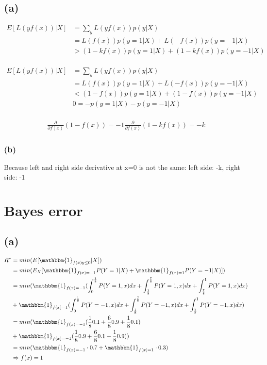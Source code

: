 \documentclass[a4paper]{scrartcl}
\begin{document}
  \subsection*{(a)}
    \begin{align*}
      E[L(yf(x)) \vert X]
      &= \sum_y L(yf(x)) p(y\vert X) \\
      &=  L(f(x)) p(y=1\vert X) + L(-f(x)) p(y=-1\vert X) \\
      &> (1-k f(x)) p(y=1\vert X) + (1-k f(x)) p(y=-1\vert X) \\
    \end{align*}

    \begin{align*}
      E[L(yf(x)) \vert X]
      &= \sum_y L(yf(x)) p(y\vert X) \\
      &=  L(f(x)) p(y=1\vert X) + L(-f(x)) p(y=-1\vert X) \\
      &< (1-f(x)) p(y=1\vert X) + (1-f(x)) p(y=-1\vert X) \\
      &0 = - p(y=1\vert X) - p(y=-1\vert X) \\
    \end{align*}

    \begin{align*}
      \frac{\partial}{\partial f(x)} (1-f(x)) = -1
      \frac{\partial}{\partial f(x)} (1-kf(x)) = -k
    \end{align*}




  \subsubsection*{(b)}
    Because left and right side derivative at x=0 is not the same:
    left side: -k, right side: -1

\section{Bayes error}
  \subsection*{(a)}
    \begin{align*}
      R^* & = min(E[\mathbbm{1}_{f(x) y\leq 0} \vert X])\\
      & = min(E_X [\mathbbm{1}_{f(x)=-1} P(Y=1 \vert X)+ \mathbbm{1}_{f(x)=1} P(Y=-1 \vert X)])\\
      & = min(\mathbbm{1}_{f(x)=-1} (\int_0^\frac{1}{8}P(Y=1, x) dx + \int_\frac{1}{8}^\frac{7}{8} P(Y=1, x) dx + \int_\frac{7}{8}^1 P(Y=1, x) dx)\\
      & + \mathbbm{1}_{f(x)=1} (\int_0^\frac{1}{8}P(Y=-1, x) dx + \int_\frac{1}{8}^\frac{7}{8} P(Y=-1, x) dx + \int_\frac{7}{8}^1 P(Y=-1, x) dx)\\
      & = min(\mathbbm{1}_{f(x)=-1} (\frac{1}{8}0.1 + \frac{6}{8} 0.9 + \frac{1}{8} 0.1)\\
      & + \mathbbm{1}_{f(x)=-1} (\frac{1}{8}0.9 + \frac{6}{8} 0.1 + \frac{1}{8} 0.9))\\
      & = min(\mathbbm{1}_{f(x)=-1} \cdot 0.7 + \mathbbm{1}_{f(x)=1} \cdot 0.3)\\
      & \Rightarrow f(x) = 1
    \end{align*}
\end{document}
